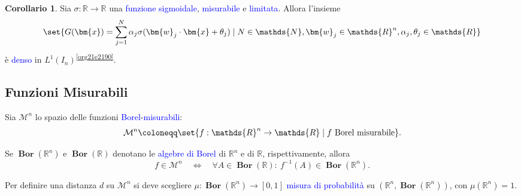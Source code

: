 \documentclass[10pt]{book}
\newcommand{\1}{\mathds{1}}
\newcommand{\R}{\mathds{R}}
\newcommand{\N}{\mathds{N}}
\theoremstyle{definition}%
\newtheorem{cor}[thm]{Corollario}
\theoremstyle{plain}
\theoremstyle{remark}
\renewcommand{\href}[2]{\textcolor{blue}{#2}}
\begin{document}
\begin{cor}
Sia \(\sigma:\R\to\R\) una \href{../../../../../org/roam/20250202170607-classe_relazione_binaria.org}{funzione} \href{../../../../../org/roam/20250625110110-funzione_sigmoidale.org}{sigmoidale}, \href{../../../../../org/roam/20250704104947-funzione_misurabile.org}{misurabile} e \href{../../../../../org/roam/20250704145518-funzione_limitata.org}{limitata}. Allora l'insieme
\begin{equation*}
\set{
G(\bm{x}) = \sum_{j=1}^{N}\alpha_{j}\sigma(\bm{w}_{j}\cdot \bm{x} + \theta_{j})\mid N \in \N, \bm{w}_{j} \in \R^{n}, \alpha_{j},\theta_{j} \in \R
}
\end{equation*}
è \href{../../../../../org/roam/20250301193045-sottoinsieme_denso.org}{denso} in \(L^{1}(I_{n})\)\textsuperscript{\ref{org21e2190}}.
\label{thm9.3.18}
\end{cor}
\subsection{Funzioni Misurabili}
\label{sec:org3fae866}

Sia \(\mathcal{M}^{n}\) lo spazio delle funzioni \href{../../../../../org/roam/20250704104938-algebra_di_borel.org}{Borel}-\href{../../../../../org/roam/20250704104947-funzione_misurabile.org}{misurabili}:
\begin{equation*}
\mathcal{M}^{n}\coloneqq \set{f:\R^{n}\to \R\mid f\text{ Borel misurabile}}.
\end{equation*}

Se \(\bm{{\operatorname{Bor}}}(\R^{n})\) e \(\bm{{\operatorname{Bor}}}(\R)\) denotano le \href{../../../../../org/roam/20250704104938-algebra_di_borel.org}{algebre di Borel} di \(\R^{n}\) e di \(\R\), rispettivamente, allora
\begin{equation*}
f \in \mathcal{M}^{n}\quad \iff\quad \forall A \in \bm{{\operatorname{Bor}}}(\R): \ f^{-1}(A) \in \bm{{\operatorname{Bor}}}(\R^{n}).
\end{equation*}

Per definire una distanza \(d\) su \(\mathcal{M}^{n}\) si deve scegliere \(\mu:\bm{{\operatorname{Bor}}}(\R^{n})\to [0,1]\) \href{../../../../../org/roam/20250704105515-misura_di_probabilita.org}{misura di probabilità} su \(\left(\R^{n}, \bm{{\operatorname{Bor}}}(\R^{n})\right)\), con \(\mu(\R^{n})=1\).
\end{document}
